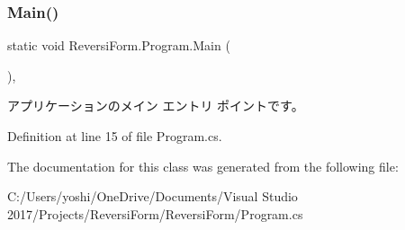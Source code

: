 \subsubsection{\texorpdfstring{Main()}{Main()}}
{\footnotesize\ttfamily static void Reversi\+Form.\+Program.\+Main (\begin{DoxyParamCaption}{ }\end{DoxyParamCaption})\hspace{0.3cm}{\ttfamily [static]}, {\ttfamily [private]}}



アプリケーションのメイン エントリ ポイントです。 



Definition at line 15 of file Program.\+cs.



The documentation for this class was generated from the following file\+:\begin{DoxyCompactItemize}
\item 
C\+:/\+Users/yoshi/\+One\+Drive/\+Documents/\+Visual Studio 2017/\+Projects/\+Reversi\+Form/\+Reversi\+Form/Program.\+cs\end{DoxyCompactItemize}
